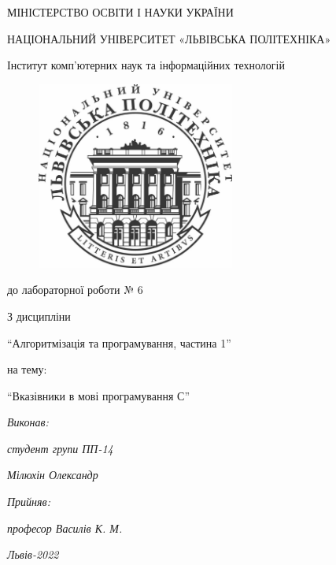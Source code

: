 \begin{titlepage}
\pagestyle{empty}
\begin{center}

	{\fontsize{14}{24}\selectfont МІНІСТЕРСТВО ОСВІТИ І НАУКИ УКРАЇНИ

	НАЦІОНАЛЬНИЙ УНІВЕРСИТЕТ «ЛЬВІВСЬКА ПОЛІТЕХНІКА»

	Інститут комп'ютерних наук та інформаційних технологій

	}

	\vspace{90.4pt} %
	\begin{figure}[h]
		\centering
		\includegraphics[width=6.5cm,keepaspectratio]{../../../lpnu.png}
	\end{figure}

	{\fontsize{18}{29}\selectfont{Звіт}

	{до лабораторної роботи № 6}

	{З дисципліни}

	{``Алгоритмізація та програмування, частина 1''}

	{на тему:}

	{``Вказівники в мові програмування С''}

	}
\end{center}

\vspace{12.1pt} %
	{\fontsize{14}{22.4}\selectfont
\begin{flushright}
	\textit{Виконав:}

	\textit{студент групи ПП-14}

	\textit{Мілюхін Олександр}

	\textit{Прийняв:}

	\textit{професор Василів К. М.}
\end{flushright}
\vspace{37.4pt} %
\begin{center}
\textit{Львів-2022}
\end{center}
	}
\end{titlepage}
